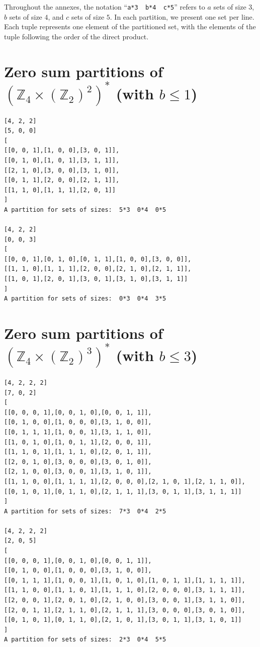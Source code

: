\documentclass[final]{dmtcs-episciences}
\newcommand{\zet}{\mathbb{Z}}
\begin{document}
\begin{appendices}

Throughout the annexes, the notation ``\verb|a*3  b*4  c*5|'' refers to $a$ sets of size $3$, $b$ sets of size $4$, and $c$ sets of size $5$. In each partition, we present one set per line. Each tuple represents one element of the partitioned set, with the elements of the tuple following the order of the direct product.
\scriptsize

\section{\texorpdfstring{Zero sum partitions of $\left(\zet_4\times(\zet_2)^{2}\right)^*$ (with $b \leq 1$)}{Zero sum partitions of (Z4 x (Z2)**2)* (with b <= 1)}}\label{a:422}

\begin{verbatim}
[4, 2, 2]
[5, 0, 0]
[
[[0, 0, 1],[1, 0, 0],[3, 0, 1]],
[[0, 1, 0],[1, 0, 1],[3, 1, 1]],
[[2, 1, 0],[3, 0, 0],[3, 1, 0]],
[[0, 1, 1],[2, 0, 0],[2, 1, 1]],
[[1, 1, 0],[1, 1, 1],[2, 0, 1]]
]
A partition for sets of sizes:  5*3  0*4  0*5

[4, 2, 2]
[0, 0, 3]
[
[[0, 0, 1],[0, 1, 0],[0, 1, 1],[1, 0, 0],[3, 0, 0]],
[[1, 1, 0],[1, 1, 1],[2, 0, 0],[2, 1, 0],[2, 1, 1]],
[[1, 0, 1],[2, 0, 1],[3, 0, 1],[3, 1, 0],[3, 1, 1]]
]
A partition for sets of sizes:  0*3  0*4  3*5
\end{verbatim}

\section{\texorpdfstring{Zero sum partitions of $\left(\zet_4\times(\zet_2)^{3}\right)^*$ (with $b\leq 3$)}{Zero sum partitions of (Z4 x (Z2)**3)* (with b <= 3)}}\label{a:4222}
\begin{verbatim}
[4, 2, 2, 2]
[7, 0, 2]
[
[[0, 0, 0, 1],[0, 0, 1, 0],[0, 0, 1, 1]],
[[0, 1, 0, 0],[1, 0, 0, 0],[3, 1, 0, 0]],
[[0, 1, 1, 1],[1, 0, 0, 1],[3, 1, 1, 0]],
[[1, 0, 1, 0],[1, 0, 1, 1],[2, 0, 0, 1]],
[[1, 1, 0, 1],[1, 1, 1, 0],[2, 0, 1, 1]],
[[2, 0, 1, 0],[3, 0, 0, 0],[3, 0, 1, 0]],
[[2, 1, 0, 0],[3, 0, 0, 1],[3, 1, 0, 1]],
[[1, 1, 0, 0],[1, 1, 1, 1],[2, 0, 0, 0],[2, 1, 0, 1],[2, 1, 1, 0]],
[[0, 1, 0, 1],[0, 1, 1, 0],[2, 1, 1, 1],[3, 0, 1, 1],[3, 1, 1, 1]]
]
A partition for sets of sizes:  7*3  0*4  2*5

[4, 2, 2, 2]
[2, 0, 5]
[
[[0, 0, 0, 1],[0, 0, 1, 0],[0, 0, 1, 1]],
[[0, 1, 0, 0],[1, 0, 0, 0],[3, 1, 0, 0]],
[[0, 1, 1, 1],[1, 0, 0, 1],[1, 0, 1, 0],[1, 0, 1, 1],[1, 1, 1, 1]],
[[1, 1, 0, 0],[1, 1, 0, 1],[1, 1, 1, 0],[2, 0, 0, 0],[3, 1, 1, 1]],
[[2, 0, 0, 1],[2, 0, 1, 0],[2, 1, 0, 0],[3, 0, 0, 1],[3, 1, 1, 0]],
[[2, 0, 1, 1],[2, 1, 1, 0],[2, 1, 1, 1],[3, 0, 0, 0],[3, 0, 1, 0]],
[[0, 1, 0, 1],[0, 1, 1, 0],[2, 1, 0, 1],[3, 0, 1, 1],[3, 1, 0, 1]]
]
A partition for sets of sizes:  2*3  0*4  5*5
\end{verbatim}


\end{appendices}
\end{document}

